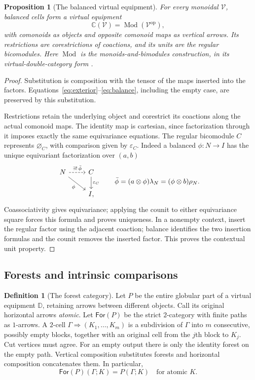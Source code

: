 \documentclass[11pt,a4paper]{article}
\newtheorem{proposition}[theorem]{Proposition}
\theoremstyle{definition}
\newtheorem{definition}[theorem]{Definition}
\theoremstyle{remark}
\numberwithin{equation}{section}
\newcommand{\V}{\mathcal V}
\newcommand{\D}{\mathbb D}
\newcommand{\Ccal}{\mathbb C}
\newcommand{\cell}{\mathrel{\Longrightarrow}}
\newcommand{\emp}[1]{\varnothing_{#1}}
\newcommand{\eps}{\varepsilon}
\newcommand{\op}{\mathrm{op}}
\newcommand{\Mod}{\operatorname{Mod}}
\newcommand{\For}{\mathsf{For}}
\begin{document}
\begin{proposition}[The balanced virtual equipment]\label{prop:balanced-equipment}
For every monoidal $\V$, balanced cells form a virtual equipment
\[
\Ccal(\V)=\Mod(\V^{\op}),
\]
with comonoids as objects and \emph{opposite} comonoid maps as vertical
arrows. Its restrictions are corestrictions of coactions, and its units
are the regular bicomodules. Here $\Mod$ is the monoids-and-bimodules
construction, in its virtual-double-category form
\cite[Definition 2.8]{CS}.
\end{proposition}
\begin{proof}
Substitution is composition with the tensor of the maps inserted into
the factors. Equations~\eqref{eq:exterior}--\eqref{eq:balance}, including the empty
case, are preserved by this substitution.

Restrictions retain
the underlying object and corestrict its coactions along the actual
comonoid maps. The identity map is cartesian, since factorization through
it imposes exactly the same equivariance equations. The regular
bicomodule $C$ represents $\emp C$, with comparison given by $\eps_C$.
Indeed a balanced $\phi:N\to I$ has the unique equivariant factorization
over $(a,b)$
\[
\begin{tikzcd}
N \arrow[r,dashed,"\exists!\,\bar\phi"] \arrow[dr,"\phi"'] &
C \arrow[d,"\eps_C"]\\
& I,
\end{tikzcd}
\qquad
\bar\phi=(a\otimes\phi)\lambda_N=(\phi\otimes b)\rho_N.
\]
Coassociativity gives equivariance; applying the counit to either
equivariance square forces this formula and proves uniqueness.
In a nonempty context, insert the regular factor using the adjacent
coaction; balance identifies the two insertion formulas and the counit
removes the inserted factor. This proves the contextual unit property.
\end{proof}

\subsection{Forests and intrinsic comparisons}

\begin{definition}[The forest category]\label{def:forests}
Let $P$ be the entire globular part of a virtual equipment $\D$, retaining
arrows between different objects. Call its original horizontal arrows
\emph{atomic}. Let $\For(P)$ be the strict $2$-category with finite paths
as $1$-arrows. A $2$-cell $\Gamma\cell(K_1,\ldots,K_m)$ is a subdivision
of $\Gamma$ into $m$ consecutive, possibly empty blocks, together with an
original cell from the $j$th block to $K_j$. Cut vertices must agree.
For an empty output there is only the identity forest on the empty path.
Vertical composition substitutes forests and horizontal composition
concatenates them. In particular,
\[
\For(P)(\Gamma;K)=P(\Gamma;K)
\quad\text{for atomic }K.
\]
\end{definition}
\end{document}
